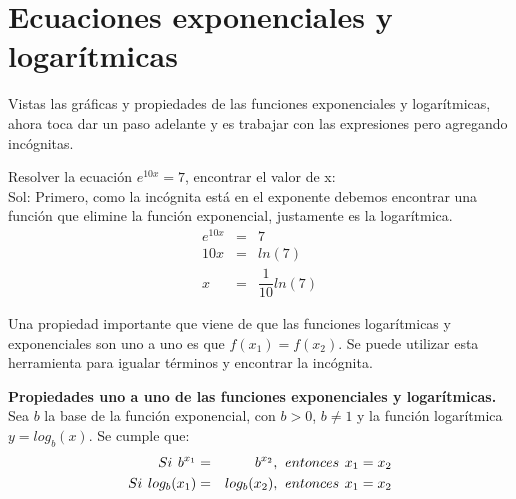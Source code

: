 \section{Ecuaciones exponenciales y logarítmicas}
Vistas las gráficas y propiedades de las funciones exponenciales y logarítmicas, ahora toca dar un paso adelante y es trabajar con las expresiones pero agregando incógnitas. 

\begin{myexample}
Resolver la ecuación $e^{10x}=7$, encontrar el valor de x:\\

\noindent Sol: Primero, como la incógnita está en el exponente debemos encontrar una función que elimine la función exponencial, justamente es la logarítmica.
\begin{eqnarray*}
e^{10x}&=&7\\
10x&=&ln(7)\\
x&=&\dfrac{1}{10}ln(7)
\end{eqnarray*}
\end{myexample}

Una propiedad importante que viene de que las funciones logarítmicas y exponenciales son uno a uno es que $f(x_{1})=f(x_{2})$. Se puede utilizar esta herramienta para igualar términos y encontrar la incógnita.

\begin{mydef}
\textbf{Propiedades uno a uno de las funciones exponenciales y logarítmicas.} Sea $b$ la base de la función exponencial, con $b>0$, $b\neq 1$ y la función logarítmica $y=log_{b}(x)$. Se cumple que:
\begin{eqnarray}
Si\hspace{4px} b^{x_{1}} &=& b^{x_{2}},\hspace{4px} entonces\hspace{4px} x_{1}=x_{2}\\
Si\hspace{4px} log_{b}(x_{1})&=&log_{b}(x_{2}),\hspace{4px} entonces\hspace{4px} x_{1}=x_{2}
\end{eqnarray}
\end{mydef}

